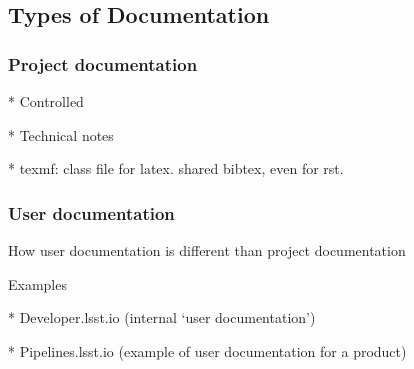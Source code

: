 \subsection{Types of Documentation}

\subsubsection{Project documentation}

* Controlled

* Technical notes

* texmf: class file for latex. shared bibtex, even for rst.

\subsubsection{User documentation}

How user documentation is different than project documentation

Examples

* Developer.lsst.io (internal ‘user documentation’)

* Pipelines.lsst.io (example of user documentation for a product)
